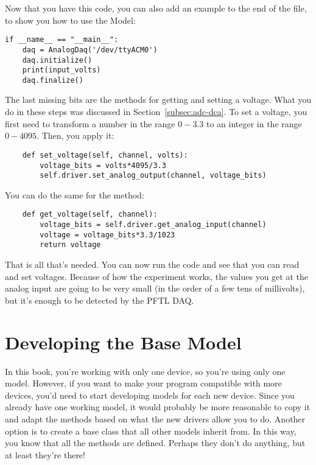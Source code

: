 Now that you have this code, you can also add an example to the end of the file, to show you how to use the Model:

\begin{verbatim}
if __name__ == "__main__":
    daq = AnalogDaq('/dev/ttyACM0')
    daq.initialize()
    print(input_volts)
    daq.finalize()
\end{verbatim}

The last missing bits are the methods for getting and setting a voltage. What you do in these steps was discussed in Section~\ref{subsec:adc-dca}. To set a voltage, you first need to transform a number in the range $0-3.3$ to an integer in the range $0-4095$. Then, you apply it:

\begin{verbatim}
    def set_voltage(self, channel, volts):
        voltage_bits = volts*4095/3.3
        self.driver.set_analog_output(channel, voltage_bits)
\end{verbatim}

You can do the same for the  method:

\begin{verbatim}
    def get_voltage(self, channel):
        voltage_bits = self.driver.get_analog_input(channel)
        voltage = voltage_bits*3.3/1023
        return voltage
\end{verbatim}

That is all that's needed. You can now run the code and see that you can read and set voltages. Because of how the experiment works, the values you get at the analog input are going to be very small (in the order of a few tens of millivolts), but it's enough to be detected by the {PFTL DAQ}.

\section{Developing the Base Model}\label{sec:base-model}
In this book, you're working with only one device, so you're using only one model. However, if you want to make your program compatible with more devices, you'd need to start developing models for each new device. Since you already have one working model, it would probably be more reasonable to copy it and adapt the methods based on what the new drivers allow you to do. Another option is to create a base class that all other models inherit from. In this way, you know that all the methods are defined. Perhaps they don't do anything, but at least they're there!

